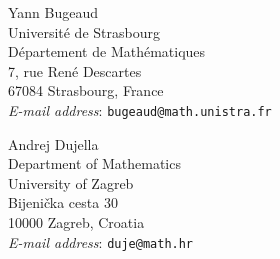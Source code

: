 \documentclass [11pt] {article}
\begin{document}
\bigskip

{\small \noindent
Yann Bugeaud \\
Universit\'e de Strasbourg  \\
D\'epartement de Math\'ematiques \\ 7, rue Ren\'e Descartes \\
67084 Strasbourg, France \\
{\em E-mail address}: {\tt bugeaud@math.unistra.fr}}

\bigskip

{\small \noindent
Andrej Dujella \\
Department of Mathematics \\ University of
Zagreb
\\ Bijeni\v{c}ka cesta 30 \\
10000 Zagreb, Croatia \\
{\em E-mail address}: {\tt duje@math.hr}}
\end{document}

